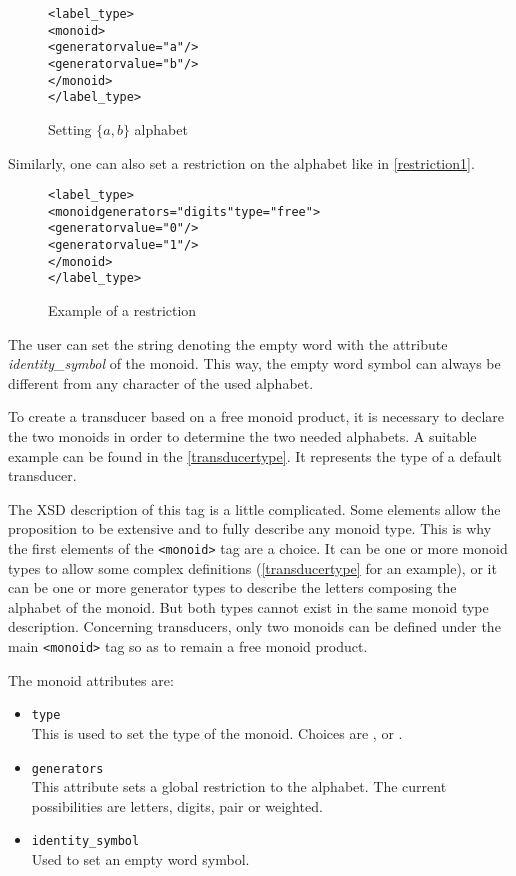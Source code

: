 \documentclass[a4paper]{article}
\newcommand{\xtag}[1]{\texttt{<#1>}}
\newcommand{\xattr}[1]{\texttt{#1}}
\def\monoidtag{\xtag{monoid}}
\begin{document}
\begin{figure}[ht]
  \small
  \begin{center}
\begin{alltt}
<label_type>
  <monoid>
     <generator value="a"/>
     <generator value="b"/>
  </monoid>
</label_type>
\end{alltt}

\caption{Setting $\{a, b\}$ alphabet}
\label{alpha1}
  \end{center}
\end{figure}

Similarly, one can also set a restriction on the alphabet like in
\autoref{restriction1}.

\begin{figure}[ht]
  \small
  \begin{center}
\begin{alltt}
<label_type>
  <monoid generators="digits" type="free">
    <generator value="0"/>
    <generator value="1"/>
  </monoid>
</label_type>
\end{alltt}

\caption{Example of a restriction}
\label{restriction1}
  \end{center}
\end{figure}


The user can set the string denoting the empty word with the attribute
\textit{identity\_symbol} of the monoid. This way, the empty word
symbol can always be different from any character of the used
alphabet.

To create a transducer based on a free monoid product, it is necessary
to declare the two monoids in order to determine the two needed
alphabets. A suitable example can be found in the
\autoref{transducertype}. It represents the type of a default
transducer.

The XSD description of this tag is a little complicated. Some elements
allow the proposition to be extensive and to fully describe any monoid
type. This is why the first elements of the \monoidtag{} tag are a
choice. It can be one or more monoid types to allow some complex
definitions (\autoref{transducertype} for an example), or it can
be one or more generator types to describe the letters composing the
alphabet of the monoid. But both types cannot exist in the same monoid
type description. Concerning transducers, only two monoids can be
defined under the main \monoidtag{} tag so as to remain a free monoid
product.

The monoid attributes are:
\begin{itemize}
\item \xattr{type}\\
  This is used to set the type of the monoid. Choices are ,
   or .
\item \xattr{generators}\\
  This attribute sets a global restriction to the alphabet. The
  current possibilities are letters, digits, pair or weighted.
\item \xattr{identity\_symbol}\\
  Used to set an empty word symbol.
\end{itemize}
\newpage
\end{document}

